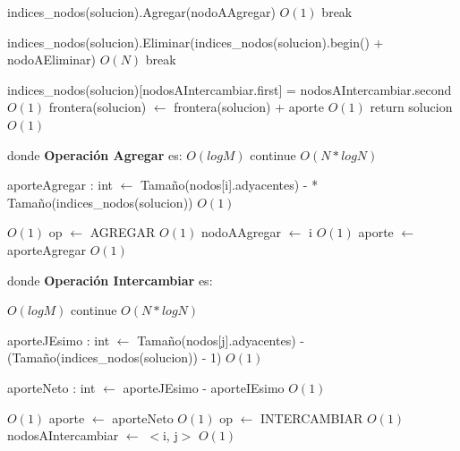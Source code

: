 \documentclass[a4paper, 10pt, twoside]{article}
\newenvironment{pseudo}[1][]{%
    \vspace{1em}%
    \begin{algorithmic}%
}
{%
    \end{algorithmic}%
    \vspace{1em}%
}
\newcommand{\Ode}[1]{\hfill $O(#1)$}
\begin{document}
\begin{pseudo}
		    \State indices\_nodos(solucion).Agregar(nodoAAgregar) 								\Ode{1}
		    \State break
	    \EndCase

		    \State indices\_nodos(solucion).Eliminar(indices\_nodos(solucion).begin() + nodoAEliminar) \Ode{N}
		    \State break
	    \EndCase

		    \State indices\_nodos(solucion)[nodosAIntercambiar.first] = nodosAIntercambiar.second    \Ode{1}
	    \EndCase
	\EndSwitch
	\State
	\State frontera(solucion) $\leftarrow$ frontera(solucion) + aporte 								\Ode{1}
	\State return solucion 																			\Ode{1}

\EndProcedure

\State donde \textbf{Operación Agregar} es:
\State
																					\Ode{log M}
			\State continue
			\EndIf
											\Ode{N*log N}

				\State aporteAgregar : int $\leftarrow$ Tamaño(nodos[i].adyacentes) - 
				 * Tamaño(indices\_nodos(solucion))															\Ode{1}

																						\Ode{1}
					\State op $\leftarrow$ AGREGAR 																	\Ode{1}
					\State nodoAAgregar $\leftarrow$ i 																\Ode{1}
					\State aporte $\leftarrow$ aporteAgregar														\Ode{1}
				\EndIf
			\EndIf
		\EndFor

\State
\State donde \textbf{Operación Intercambiar} es:
\State

																					\Ode{log M}
					\State continue
				\EndIf
									\Ode{N*log N}

					\State aporteJEsimo : int $\leftarrow$ Tamaño(nodos[j].adyacentes) - 
					\State (Tamaño(indices\_nodos(solucion)) - 1)													\Ode{1}

					\State aporteNeto : int $\leftarrow$ aporteJEsimo - aporteIEsimo								\Ode{1}

																							\Ode{1}
						\State aporte $\leftarrow$ aporteNeto														\Ode{1}
						\State op $\leftarrow$ INTERCAMBIAR 														\Ode{1}
						\State nodosAIntercambiar $\leftarrow$ $<$i, j$>$ 											\Ode{1}
					\EndIf
				\EndIf
			\EndFor		


\end{pseudo}
\end{document}

